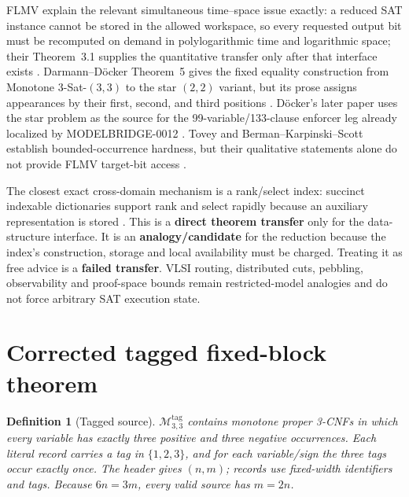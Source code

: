 \documentclass[11pt]{article}
\newtheorem{definition}{Definition}
\newcommand{\Mthree}{\mathcal M_{3,3}^{\mathrm{tag}}}
\begin{document}
FLMV explain the relevant simultaneous time--space issue exactly: a reduced
SAT instance cannot be stored in the allowed workspace, so every requested
output bit must be recomputed on demand in polylogarithmic time and
logarithmic space; their Theorem~3.1 supplies the quantitative transfer only
after that interface exists \cite{flmv}.  Darmann--D\"ocker Theorem~5 gives
the fixed equality construction from Monotone 3-Sat-$(3,3)$ to the star
$(2,2)$ variant, but its prose assigns appearances by their first, second,
and third positions \cite{dd}.  D\"ocker's later paper uses the star problem
as the source for the 99-variable/133-clause enforcer leg already localized
by MODELBRIDGE-0012 \cite{doecker}.  Tovey and
Berman--Karpinski--Scott establish bounded-occurrence hardness, but their
qualitative statements alone do not provide FLMV target-bit access
\cite{tovey,bks}.

The closest exact cross-domain mechanism is a rank/select index: succinct
indexable dictionaries support rank and select rapidly because an auxiliary
representation is stored \cite{rrr}.  This is a \textbf{direct theorem
transfer} only for the data-structure interface.  It is an
\textbf{analogy/candidate} for the reduction because the index's construction,
storage and local availability must be charged.  Treating it as free advice
is a \textbf{failed transfer}.  VLSI routing, distributed cuts, pebbling,
observability and proof-space bounds remain restricted-model analogies and
do not force arbitrary SAT execution state.

\section{Corrected tagged fixed-block theorem}

\begin{definition}[Tagged source]
$\Mthree$ contains monotone proper 3-CNFs in which every variable has exactly
three positive and three negative occurrences.  Each literal record carries
a tag in $\{1,2,3\}$, and for each variable/sign the three tags occur exactly
once.  The header gives $(n,m)$; records use fixed-width identifiers and tags.
Because $6n=3m$, every valid source has $m=2n$.
\end{definition}
\end{document}
